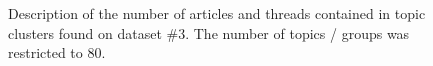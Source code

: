 \begin{figure}[H]%
\label{artthreads}
\centering
{}%
\qquad
{}%
\caption{Description of the number of articles and threads contained in topic clusters found on dataset \#3. The number of topics / groups was restricted to 80.}
\end{figure}

